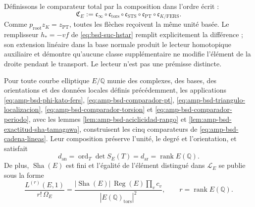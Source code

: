Définissons le comparateur total par la composition dans l'ordre écrit :
\begin{equation}\label{eq:amp-bsd-comparador-total}
 \mathfrak C_E:=
 \mathfrak c_\infty\circ
 \mathfrak c_{\mathrm{tors}}\circ
 \mathfrak c_{\mathrm{STS}}\circ
 \mathfrak c_{\mathrm{PT}}\circ
 \mathfrak c_{K/\mathrm{FERS}}.
\end{equation}
Comme \(p_{\mathrm{root}}z_K=z_{\mathrm{PT}}\), toutes les flèches reçoivent la
même unité basée. Le remplisseur \(h_*=-vf\) de
\eqref{eq:bsd-suc-hstar} remplit explicitement la différence ; son extension
linéaire dans la base normale produit le lecteur homotopique auxiliaire et démontre
qu'aucune classe supplémentaire ne modifie l'élément de la droite pendant le
transport. Le lecteur n'est pas une prémisse distincte.

\begin{theorem}
\label{thm:amp-bsd-comparadores-construidos}
Pour toute courbe elliptique \(E/\mathbb Q\) munie des complexes, des bases,
des orientations et des données locales définis précédemment, les applications
\eqref{eq:amp-bsd-phi-kato-fers},
\eqref{eq:amp-bsd-comparador-pt},
\eqref{eq:amp-bsd-triangulo-localizacion},
\eqref{eq:amp-bsd-comparador-torsion} et
\eqref{eq:amp-bsd-comparador-periodo}, avec les lemmes
\ref{lem:amp-bsd-aciclicidad-rango} et
\ref{lem:amp-bsd-exactitud-sha-tamagawa}, construisent les cinq comparateurs de
\eqref{eq:amp-bsd-cadena-lineas}. Leur composition préserve l'unité, le degré
et l'orientation, et satisfait
\begin{equation}\label{eq:amp-bsd-igualdad-grados}
 d_{\mathrm{an}}=\operatorname{ord}_T\det S_E(T)
 =d_{\mathrm{ar}}=\operatorname{rank}E(\mathbb Q).
\end{equation}
De plus, \(\operatorname{Sha}(E)\) est fini et l'égalité de l'élément
distingué dans \(\mathcal L_E\) se publie sous la forme
\begin{equation}\label{eq:amp-bsd-termino-principal}
 \frac{L^{(r)}(E,1)}{r!\,\Omega_E}
 =\frac{|\operatorname{Sha}(E)|\,\operatorname{Reg}(E)
        \prod_v c_v}
       {|E(\mathbb Q)_{\mathrm{tors}}|^2},
 \qquad r=\operatorname{rank}E(\mathbb Q).
\end{equation}
\end{theorem}


